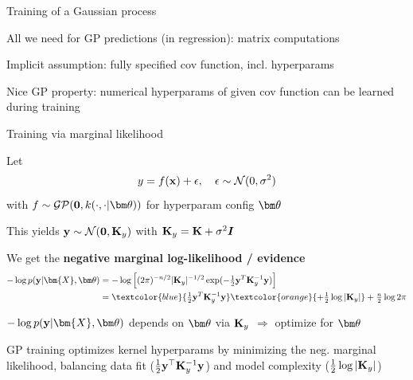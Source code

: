 \documentclass[11pt,compress,t,notes=noshow, xcolor=table]{beamer}
\begin{document}

\begin{framei}[sep=L]{Training of a Gaussian process}
\item All we need for GP predictions (in regression): matrix computations
\item Implicit assumption: fully specified cov function, incl. hyperparams
\item Nice GP property: numerical hyperparams of given cov function can be learned during training
\end{framei}

\begin{framei}[sep=L]{Training via marginal likelihood}
\item Let $$y = f(\mathbf{x}) + \epsilon, \quad \epsilon \sim \mathcal{N}(0, \sigma^2)$$
with $f \sim \mathcal{GP}(\zero, k(\cdot, \cdot | \thetav))$ for hyperparam config $\thetav$
\item This yields $\mathbf{y} \sim \mathcal{N}(\mathbf{0}, \mathbf{K}_y )$ with  $\mathbf{K}_y = \mathbf{K} + \sigma^2 \boldsymbol{I}$
\item We get the \textbf{negative marginal log-likelihood / evidence}
\begin{eqnarray*}
-\log p(\yv | \bm{X}, \thetav) &= -\log \left[(2 \pi )^{-n / 2} |\Ky|^{-1 / 2} \exp(- \tfrac{1}{2} \yv^T \Ky^{-1} \yv) \right] \\
&= \textcolor{blue}{\tfrac{1}{2} \yv^T \Ky^{-1} \yv} \textcolor{orange}{+ \tfrac{1}{2} \log | \Ky |}  + \tfrac{n}{2} \log 2 \pi
\end{eqnarray*}
\item $-\log p(\yv | \bm{X}, \thetav)$ depends on $\thetav$ via $\mathbf{K}_y$ $\Rightarrow$ optimize for $\thetav$
\item GP training optimizes kernel hyperparams by minimizing the neg. marginal likelihood, balancing data fit ($\tfrac{1}{2}\mathbf{y}^\top \mathbf{K}_y^{-1}\mathbf{y}$) and model complexity ($\tfrac{1}{2}\log|\mathbf{K}_y|$)
\end{framei}
\end{document}
